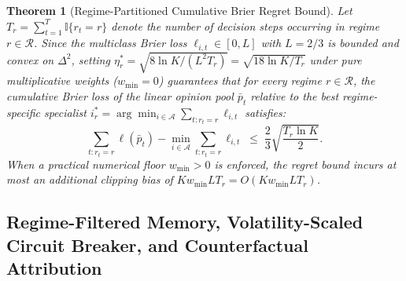 \documentclass[10pt,a4paper,twocolumn]{article}
\newtheorem{theorem}{Theorem}
\begin{document}
\begin{theorem}[Regime-Partitioned Cumulative Brier Regret Bound]
Let $T_r = \sum_{t=1}^T \mathbb{I}\{r_t = r\}$ denote the number of decision steps occurring in regime $r \in \mathcal{R}$. Since the multiclass Brier loss $\ell_{i,t} \in [0, L]$ with $L = 2/3$ is bounded and convex on $\Delta^2$, setting $\eta_r^* = \sqrt{8 \ln K / (L^2 T_r)} = \sqrt{18 \ln K / T_r}$ under pure multiplicative weights ($w_{\min} = 0$) guarantees that for every regime $r \in \mathcal{R}$, the cumulative Brier loss of the linear opinion pool $\bar{p}_t$ relative to the best regime-specific specialist $i_r^* = \arg\min_{i \in \mathcal{A}} \sum_{t: r_t = r} \ell_{i,t}$ satisfies:
\begin{equation}
  \sum_{t: r_t = r} \ell(\bar{p}_t) - \min_{i \in \mathcal{A}} \sum_{t: r_t = r} \ell_{i,t} \;\le\; \frac{2}{3}\sqrt{\frac{T_r \ln K}{2}}.
\end{equation}
When a practical numerical floor $w_{\min} > 0$ is enforced, the regret bound incurs at most an additional clipping bias of $K w_{\min} L T_r = O(K w_{\min} L T_r)$.
\end{theorem}

\subsection{Regime-Filtered Memory, Volatility-Scaled Circuit Breaker, and Counterfactual Attribution}
\end{document}
